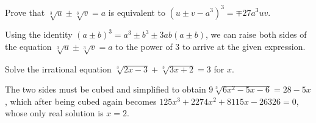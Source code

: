 \begin{tcolorbox}[title={Rationalizing Irrational Equations of the Form $\sqrt[3]{u} \pm \sqrt[3]{v} = a$}]
    \begin{question}
        Prove that $\sqrt[3]{u} \pm \sqrt[3]{v} = a$ is equivalent to $(u\pm v - a^3)^3 = \mp 27a^3uv$.
    \end{question}

\begin{solution}
    Using the identity $(a\pm b)^3 = a^3 \pm b^3 \pm 3ab(a\pm b)$, we can raise both sides of the equation $\sqrt[3]{u} \pm \sqrt[3]{v} = a$ to the power of $3$ to arrive at the given expression.
\end{solution}

\begin{question}
        Solve the irrational equation $\sqrt[3]{2x-3}+\sqrt[3]{3x+2}=3$ for $x$.
\end{question}

\begin{solution}
    The two sides must be cubed and simplified to obtain $9\sqrt[3]{6x^2-5x-6}=28-5x$, which after being cubed again becomes $125x^3+2274x^2+8115x-26326=0$, whose only real solution is $x=2$.
\end{solution}
\end{tcolorbox}


